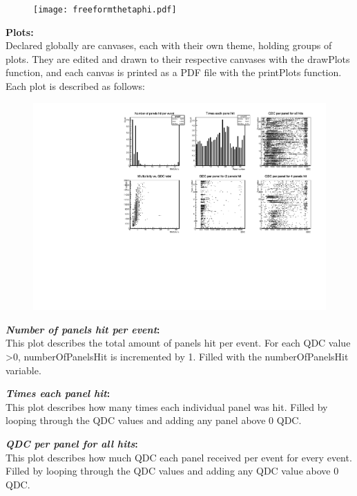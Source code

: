 \documentclass[a4paper,12pt]{article}
\begin{document}
\begin{figure}[h]
\centering
\texttt{[image: freeformthetaphi.pdf]}
\end{figure}


\pagebreak

\textbf{Plots:} \\
Declared globally are canvases, each with their own theme, holding groups of plots. They are edited and drawn to their respective canvases with the drawPlots function, and each canvas is printed as a PDF file with the printPlots function. Each plot is described as follows: \\

\begin{figure}[h]
\centering
\includegraphics[scale=0.8]{graphs.pdf}
\end{figure}

\textbf{\emph{Number of panels hit per event}:}  \\
This plot describes the total amount of panels hit per event. For each QDC value >0, numberOfPanelsHit is incremented by 1. Filled with the numberOfPanelsHit variable.

\textbf{\emph{Times each panel hit}:} \\
This plot describes how many times each individual panel was hit. Filled by looping through the QDC values and adding any panel above 0 QDC.

\textbf{\emph{QDC per panel for all hits}:} \\
This plot describes how much QDC each panel received per event for every event. Filled by looping through the QDC values and adding any QDC value above 0 QDC.
\end{document}
